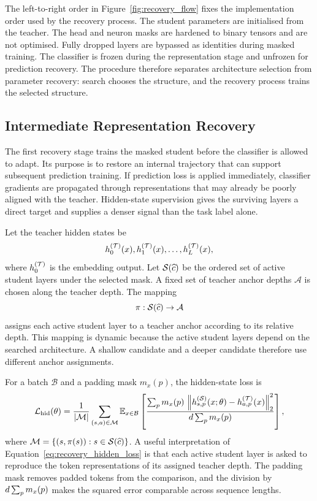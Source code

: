 The left-to-right order in Figure~\ref{fig:recovery_flow} fixes the implementation order used by the recovery process. The student parameters are initialised from the teacher. The head and neuron masks are hardened to binary tensors and are not optimised. Fully dropped layers are bypassed as identities during masked training. The classifier is frozen during the representation stage and unfrozen for prediction recovery. The procedure therefore separates architecture selection from parameter recovery: search chooses the structure, and the recovery process trains the selected structure.

\subsection{Intermediate Representation Recovery}
\label{chap:recovery_2c}

The first recovery stage trains the masked student before the classifier is allowed to adapt. Its purpose is to restore an internal trajectory that can support subsequent prediction training. If prediction loss is applied immediately, classifier gradients are propagated through representations that may already be poorly aligned with the teacher. Hidden-state supervision gives the surviving layers a direct target and supplies a denser signal than the task label alone.

Let the teacher hidden states be
\[
h^{(\mathcal{T})}_0(x),h^{(\mathcal{T})}_1(x),\ldots,h^{(\mathcal{T})}_{L}(x),
\]
where $h^{(\mathcal{T})}_0$ is the embedding output. Let $\mathcal{S}(\widehat{c})$ be the ordered set of active student layers under the selected mask. A fixed set of teacher anchor depths $\mathcal{A}$ is chosen along the teacher depth. The mapping
\[
\pi:\mathcal{S}(\widehat{c}) \rightarrow \mathcal{A}
\]
assigns each active student layer to a teacher anchor according to its relative depth. This mapping is dynamic because the active student layers depend on the searched architecture. A shallow candidate and a deeper candidate therefore use different anchor assignments.

For a batch $\mathcal{B}$ and a padding mask $m_x(p)$, the hidden-state loss is
\begin{equation}
\mathcal{L}_{\mathrm{hid}}(\theta)
=
\frac{1}{|\mathcal{M}|}
\sum_{(s,a)\in\mathcal{M}}
\mathbb{E}_{x\in\mathcal{B}}
\left[
\frac{\sum_p m_x(p)\,
\left\|h^{(\mathcal{S})}_{s,p}(x;\theta)-h^{(\mathcal{T})}_{a,p}(x)\right\|_2^2}
{d\sum_p m_x(p)}
\right],
\label{eq:recovery_hidden_loss}
\end{equation}
where $\mathcal{M}=\{(s,\pi(s)):s\in\mathcal{S}(\widehat{c})\}$. A useful interpretation of Equation~\ref{eq:recovery_hidden_loss} is that each active student layer is asked to reproduce the token representations of its assigned teacher depth. The padding mask removes padded tokens from the comparison, and the division by $d\sum_p m_x(p)$ makes the squared error comparable across sequence lengths.

